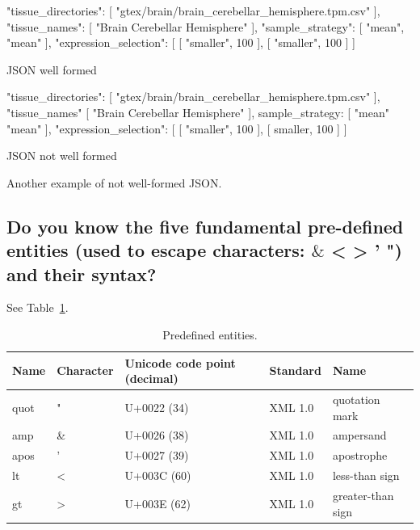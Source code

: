 \documentclass{article}
\begin{document}
\begin{center}
\begin{listing}[!ht]
  \begin{json}
    {
      "tissue_directories": [
            "gtex/brain/brain_cerebellar_hemisphere.tpm.csv"
      ],
      "tissue_names": [
            "Brain Cerebellar Hemisphere"
      ],
      "sample_strategy": [
            "mean",
            "mean"
      ],
      "expression_selection": [
            [
                  "smaller",
                  100
            ],
            [
                  "smaller",
                  100
            ]
      ]
    }
  \end{json}
  \caption[Test]{JSON well formed}
  \label{lst:test}
\end{listing}
\end{center}

\begin{center}
\begin{listing}[!ht]
  \begin{json}

      "tissue_directories": [
            "gtex/brain/brain_cerebellar_hemisphere.tpm.csv"
      ],
      "tissue_names" [
            "Brain Cerebellar Hemisphere"
      ],
      sample_strategy: [
            "mean"
            "mean"
      ],
      "expression_selection": [
            [
                  "smaller",
                  100
            ],
            [
                  smaller,
                  100
            ]
      ]

  \end{json}
  \caption[Test]{JSON not well formed}
  \label{lst:test2}
\end{listing}
\end{center}

Another example of not well-formed JSON.

\subsection{Do you know the five fundamental pre-defined entities (used to escape characters: $\&$ < > ' ") and their syntax?}

See Table~\ref{tab:predefinedentitites}.

\begin{table}
  \centering
  \begin{tabular}{lllll}
    \toprule
    Name & Character & Unicode code point (decimal) & Standard & Name\\
    \midrule
    quot & " & U+0022 (34) & XML 1.0 & quotation mark\\
    amp  & \& & U+0026 (38) & XML 1.0 & ampersand\\
    apos & ' & U+0027 (39) & XML 1.0 & apostrophe \\
    lt & < & U+003C (60) & XML 1.0 & less-than sign\\
    gt & > & U+003E (62) & XML 1.0 & greater-than sign\\
    \bottomrule
  \end{tabular}
  \caption{Predefined entities. }
  \label{tab:predefinedentitites}
\end{table}
\end{document}
